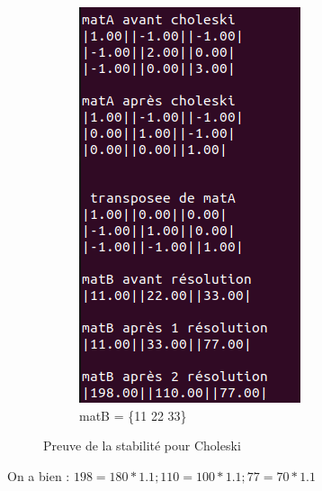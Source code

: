 \documentclass[12pt]{article}
\begin{document}
\begin{figure}[H]
\begin{subfigure}{.5\textwidth}
    \includegraphics[width=0.8\linewidth]{img/choleskiEcart1}
    \caption{matB = \{11 22 33\}}\label{Img_choleskiEcart2}
  \end{subfigure}
\caption{Preuve de la stabilité pour Choleski}
\label{Fig_choleskiTemps}
\end{figure}

On a bien : $ 198 = 180*1.1 ; 110 = 100*1.1 ; 77 = 70*1.1$
\end{document}
